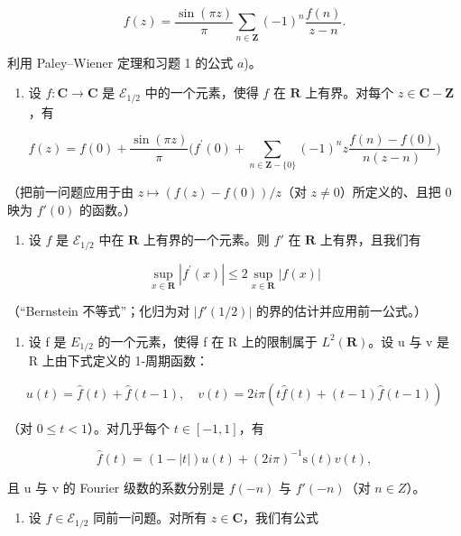\[
f (z) = \frac {\sin (\pi z)}{\pi} \sum_ {n \in \mathbf {Z}} (- 1) ^ {n} \frac {f (n)}{z - n}.
\]

利用 Paley–Wiener 定理和习题 1 的公式 \(a\))。

\begin{enumerate}
\def\labelenumi{\alph{enumi})}
\setcounter{enumi}{1}
\tightlist
\item
  设 \(f \colon \mathbf{C} \to \mathbf{C}\) 是 \(\mathcal{E}_{1/2}\) 中的一个元素，使得 \(f\) 在 \(\mathbf{R}\) 上有界。对每个 \(z \in \mathbf{C} - \mathbf{Z}\)，有
\end{enumerate}

\[
f (z) = f (0) + \frac {\sin (\pi z)}{\pi} \Big (f ^ {\prime} (0) + \sum_ {n \in \mathbf {Z} - \{0 \}} (- 1) ^ {n} z \frac {f (n) - f (0)}{n (z - n)} \Big)
\]

（把前一问题应用于由 \(z \mapsto (f(z) - f(0)) / z\)（对 \(z \neq 0\)）所定义的、且把 0 映为 \(f'(0)\) 的函数。）

\begin{enumerate}
\def\labelenumi{\alph{enumi})}
\setcounter{enumi}{2}
\tightlist
\item
  设 \(f\) 是 \(\mathcal{E}_{1/2}\) 中在 \(\mathbf{R}\) 上有界的一个元素。则 \(f'\) 在 \(\mathbf{R}\) 上有界，且我们有
\end{enumerate}

\[
\sup _ {x \in \mathbf {R}} | f ^ {\prime} (x) | \leqslant 2 \sup _ {x \in \mathbf {R}} | f (x) |
\]

（“Bernstein 不等式”；化归为对 \(|f'(1/2)|\) 的界的估计并应用前一公式。）

\begin{enumerate}
\def\labelenumi{\alph{enumi})}
\setcounter{enumi}{3}
\tightlist
\item
  设 f 是 \(E_{1/2}\) 的一个元素，使得 f 在 R 上的限制属于 \(L^{2}(\mathbf{R})\)。设 u 与 v 是 R 上由下式定义的 1-周期函数：
\end{enumerate}

\[
u (t) = \widehat {f} (t) + \widehat {f} (t - 1), \quad v (t) = 2 i \pi (t \widehat {f} (t) + (t - 1) \widehat {f} (t - 1))
\]

（对 \(0 \leqslant t < 1\)）。对几乎每个 \(t \in [-1, 1]\)，有

\[
\widehat {f} (t) = (1 - | t |) u (t) + (2 i \pi) ^ {- 1} \mathrm{s} (t) v (t),
\]

且 u 与 v 的 Fourier 级数的系数分别是 \(f(-n)\) 与 \(f'(-n)\)（对 \(n \in Z\)）。

\begin{enumerate}
\def\labelenumi{\alph{enumi})}
\setcounter{enumi}{4}
\tightlist
\item
  设 \(f \in \mathcal{E}_{1/2}\) 同前一问题。对所有 \(z \in \mathbf{C}\)，我们有公式
\end{enumerate}

